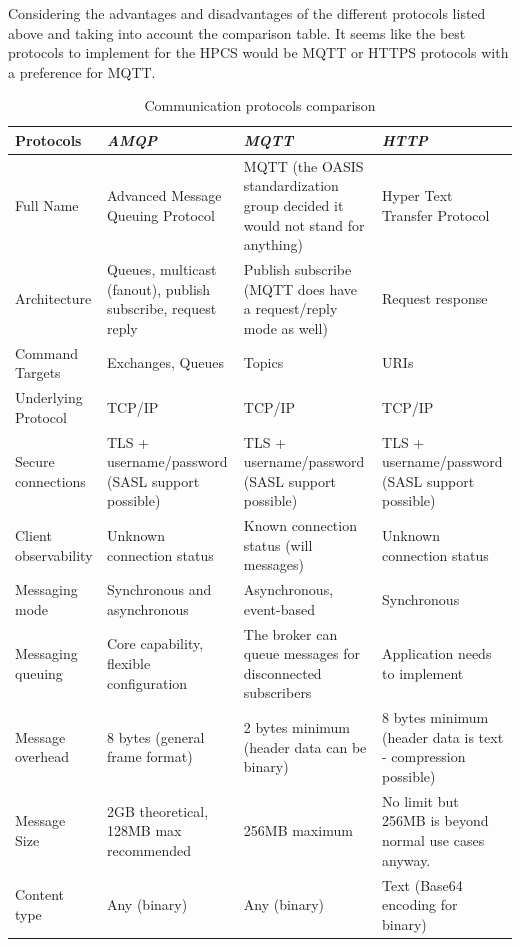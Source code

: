 Considering the advantages and disadvantages of the different protocols listed above and taking into account the comparison table.
It seems like the best protocols to implement for the HPCS would be MQTT or HTTPS protocols with a preference for MQTT.

\newpage
\begin{table}
    \caption{Communication protocols comparison}
    \begin{center}
    \renewcommand{\arraystretch}{2}
    \begin{tabular}{|p{3cm}|p{4.5cm}|p{4.5cm}|p{4.5cm}|}
    \hline
    \textbf{{Protocols}}& \textbf{\textit{AMQP}}& \textbf{\textit{MQTT}}& \textbf{\textit{HTTP}} \\
    \hline
    Full Name & Advanced Message Queuing Protocol & MQTT (the OASIS standardization group decided it would not stand for anything) & Hyper Text Transfer Protocol\\
    \hline
    Architecture & Queues, multicast (fanout), publish subscribe, request reply & Publish subscribe (MQTT does have a request/reply mode as well) & Request response\\
    \hline
    Command Targets & Exchanges, Queues & Topics & URIs\\
    \hline
    Underlying Protocol & TCP/IP & TCP/IP & TCP/IP\\
    \hline
    Secure connections & TLS + username/password (SASL support possible) & TLS + username/password (SASL support possible) & TLS + username/password (SASL support possible)\\
    \hline
    Client observability & Unknown connection status & Known connection status (will messages) & Unknown connection status\\
    \hline
    Messaging mode & Synchronous and asynchronous & Asynchronous, event-based & Synchronous\\
    \hline
    Messaging queuing & Core capability, flexible configuration & The broker can queue messages for disconnected subscribers & Application needs to implement\\
    \hline
    Message overhead & 8 bytes (general frame format) & 2 bytes minimum (header data can be binary) & 8 bytes minimum (header data is text - compression possible)\\
    \hline
    Message Size & 2GB theoretical, 128MB max recommended & 256MB maximum & No limit but 256MB is beyond normal use cases anyway.\\
    \hline
    Content type & Any (binary) & Any (binary) & Text (Base64 encoding for binary)\\

\end{tabular}
\end{center}
\end{table}
